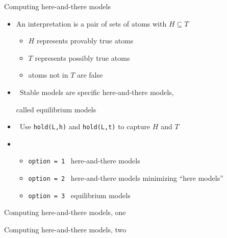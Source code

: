 \begin{frame}{Computing here-and-there models}
  \bigskip
  \begin{itemize}
  \item<1-> An {interpretation} is a pair  of sets of atoms with $H \subseteq T$
    \begin{itemize}\normalsize
    \item $H$ represents provably true atoms
    \item $T$ represents possibly true atoms
    \item atoms not in $T$ are false
    \end{itemize}
  \item<2->  \ Stable models are specific here-and-there models,
    \par called \alert<2>{equilibrium models}
    \bigskip
  \item<3->  \ Use \lstinline{hold(L,h)} and \lstinline{hold(L,t)} to capture $H$ and $T$
    \medskip
  \item<4-> 
    \begin{itemize}\normalsize
    \item \texttt{option = 1} \ here-and-there models
    \item \texttt{option = 2} \ here-and-there models minimizing ``here models''
    \item \texttt{option = 3} \ equilibrium models
    \end{itemize}
  \end{itemize}
\end{frame}
\begin{frame}[fragile]{Computing here-and-there models, one}
  \bigskip
  
\end{frame}
\begin{frame}[fragile,shrink=40]{Computing here-and-there models, two}
  \bigskip
  
\end{frame}
%
